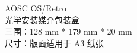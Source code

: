 


    \pagestyle{empty}
    \raggedbottom
    \raggedright
    \large

    AOSC OS/Retro\\
    光学安装媒介包装盒\\
    三围：128 mm * 179 mm * 20 mm\\
    尺寸：版面适用于 A3 纸张

    \normalsize
    
    \makeBoxAccessories

    \makeBoxCover
    \makeBoxBack

    \makeBoxPositionMarks
